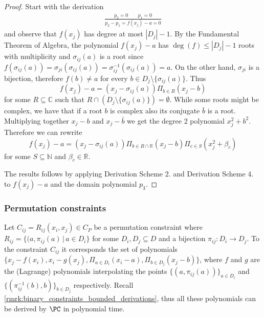 \documentclass[11pt]{article}
\begin{document}
\begin{proof}
    Start with the derivation
    \begin{align*}
        \frac{p_2 = 0 \qquad  p_1 = 0}{p_2 - p_1 = f(x_j) - a = 0}
    \end{align*}
    and observe that $f(x_j)$ has degree at most $|D_j| - 1$. By the Fundamental Theorem of Algebra, the polynomial $f(x_j) - a$ has $\deg(f) \leq |D_j| - 1$ roots with multiplicity and $\sigma_{ij}(a)$ is a root since $f(\sigma_{ij}(a)) = \sigma_{ji}(\sigma_{ij}(a)) = \sigma_{ij}^{-1}(\sigma_{ij}(a)) = a$. On the other hand, $\sigma_{ji}$ is a bijection, therefore $f(b) \neq a$ for every $b \in D_j \setminus \{\sigma_{ij}(a)\}$. Thus
    \begin{equation*}
        f(x_j) - a = (x_j - \sigma_{ij}(a))\Pi_{b \in R}(x_j - b)
    \end{equation*}
    for some $R \subseteq \mathbb{C}$ such that $R \cap \left( D_j \setminus \{ \sigma_{ij}(a) \} \right) = \emptyset$. While some roots might be complex, we have that if a root $b$ is complex also its conjugate $\bar{b}$ is a root. Multiplying together $x_j - b$ and $x_j - \bar{b}$ we get the degree 2 polynomial $x_j^2 + b^2$. Therefore we can rewrite
    \begin{equation*}
        f(x_j) - a = (x_j - \sigma_{ij}(a))\Pi_{b \in R\cap \mathbb{R}}(x_j - b) \Pi_{c \in S} (x_j^2 + \beta_c)
    \end{equation*}
    for some $S \subseteq \mathbb{N}$ and $\beta_c \in \mathbb{R}$.

    The results follows by applying Derivation Scheme 2. and Derivation Scheme 4. to $f(x_j) - a$ and the domain polynomial $p_3$.
\end{proof}

\subsubsection{Permutation constraints}\label{sect:permutation_constraints}

Let $C_{ij} = R_{ij}(x_i,x_j) \in C_P$ be a permutation constraint where $R_{ij} = \{(a, \pi_{ij}(a) \, | \, a \in D_i \}$ for some $D_i,D_j \subseteq D$ and a bijection $\pi_{ij}:D_i \rightarrow D_j$. To the constraint $C_{ij}$ it corresponds the set of polynomials $\{ x_j - f(x_i), x_i - g(x_j), \Pi_{a \in D_i} (x_i - a), \Pi_{b \in D_j}(x_j - b)\}$, where $f$ and $g$ are the (Lagrange) polynomials interpolating the points $\{(a,\pi_{ij}(a))\}_{a \in D_i}$ and $\{(\pi_{ij}^{-1}(b),b)\}_{b \in D_j}$ respectively. Recall \cref{rmrk:binary_constraints_bounded_derivations}, thus all these polynomials can be derived by $\PC$ in polynomial time.
\end{document}
